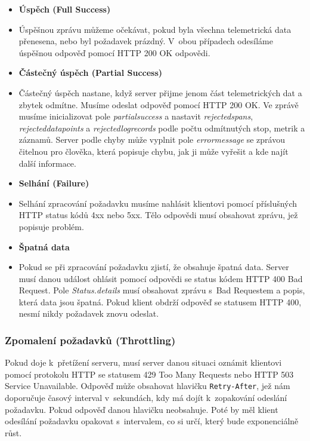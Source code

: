     \begin{itemize}
        \item{\textbf{Úspěch (Full Success)}}
        \item[]
        Úspěšnou zprávu můžeme očekávat, pokud byla všechna telemetrická data přenesena, nebo byl požadavek prázdný. V~obou případech odesíláme úspěšnou odpověď pomocí HTTP 200 OK odpovědi.
        \item{\textbf{Částečný úspěch (Partial Success)}}
        \item[]
        Částečný úspěch nastane, když server přijme jenom část telemetrických dat a zbytek odmítne. Musíme odeslat odpověď pomocí HTTP 200 OK. Ve zprávě musíme inicializovat pole \textit{partial\textunderscore  success} a nastavit \textit{rejected\textunderscore  spans}, \textit{rejected\textunderscore data\textunderscore points} a \textit{rejected\textunderscore log\textunderscore records} podle počtu odmítnutých stop, metrik a záznamů. Server podle chyby může vyplnit pole \textit{error\textunderscore  message} se zprávou čitelnou pro člověka, která popisuje chybu, jak ji může vyřešit a kde najít další informace.
        \item{\textbf{Selhání (Failure)}}
        \item[]
        Selhání zpracování požadavku musíme nahlásit klientovi pomocí příslušných HTTP status kódů 4xx nebo 5xx. Tělo odpovědi musí obsahovat zprávu, jež popisuje problém.
        \item{\textbf{Špatná data}}
        \item[]
        Pokud se při zpracování požadavku zjistí, že obsahuje špatná data. Server musí danou událost ohlásit pomocí odpovědi se status kódem HTTP 400 Bad Request. Pole \textit{Status.details} musí obsahovat zprávu s~Bad Requestem a popis, která data jsou špatná. Pokud klient obdrží odpověď se statusem HTTP 400, nesmí nikdy požadavek znovu odeslat.
    \end{itemize}

\subsubsection{Zpomalení požadavků (Throttling)}
Pokud doje k~přetížení serveru, musí server danou situaci oznámit klientovi pomocí protokolu HTTP se statusem 429 Too Many Requests nebo HTTP 503 Service Unavailable. Odpověď může obsahovat hlavičku \texttt{Retry-After}, jež nám doporučuje časový interval v~sekundách, kdy má dojít k~zopakování odeslání požadavku. Pokud odpověď danou hlavičku neobsahuje. Poté by měl klient odesílání požadavku opakovat s~intervalem, co si určí, který bude exponenciálně růst.


